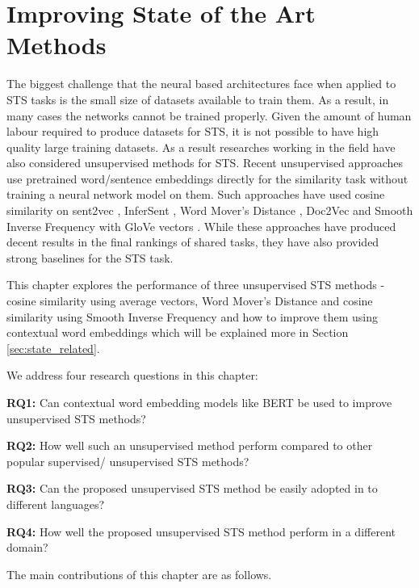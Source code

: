 \chapter{\label{cha:sts_state_of_the_art_methods}Improving State of the Art Methods}

The biggest challenge that the neural based architectures face when applied to STS tasks is the small size of datasets available to train them. As a result, in many cases the networks cannot be trained properly. Given the amount of human labour required to produce datasets for STS, it is not possible to have high quality large training datasets. As a result researches working in the field have also considered unsupervised methods for STS. Recent unsupervised approaches use pretrained word/sentence embeddings directly for the similarity task without training a neural network model on them. Such approaches have used cosine similarity on sent2vec \cite{pagliardini-etal-2018-unsupervised}, InferSent \cite{conneau-EtAl:2017:EMNLP2017}, Word Mover's Distance \cite{10.5555/3045118.3045221}, Doc2Vec \cite{10.5555/3044805.3045025} and Smooth Inverse Frequency with GloVe vectors \cite{DBLP:conf/iclr/AroraLM17}. While these approaches have produced decent results in the final rankings of shared tasks, they have also provided strong baselines for the STS task. 

This chapter explores the performance of three unsupervised STS methods - cosine similarity using average vectors, Word Mover's Distance \cite{10.5555/3045118.3045221} and cosine similarity using Smooth Inverse Frequency \cite{DBLP:conf/iclr/AroraLM17} and how to improve them using contextual word embeddings which will be explained more in Section \ref{sec:state_related}. 

We address four research questions in this chapter:

\textbf{RQ1:} Can contextual word embedding models like BERT be used to improve unsupervised STS methods?

\textbf{RQ2:} How well such an unsupervised method perform compared to other popular supervised/ unsupervised STS methods?

\textbf{RQ3:} Can the proposed unsupervised STS method be easily adopted in to different languages?

\textbf{RQ4:} How well the proposed unsupervised STS method perform in a different domain? 


The main contributions of this chapter are as follows.

